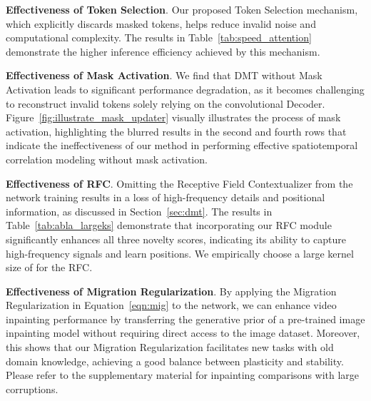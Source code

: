 \documentclass[10pt,twocolumn,letterpaper]{article}
\begin{document}
\noindent
\textbf{Effectiveness of Token Selection}. Our proposed Token Selection mechanism, which explicitly discards masked tokens, helps reduce invalid noise and computational complexity. The results in Table~\ref{tab:speed_attention} demonstrate the higher inference efficiency achieved by this mechanism.


\noindent
\textbf{Effectiveness of Mask Activation}. We find that DMT without Mask Activation leads to significant performance degradation, as it becomes challenging to reconstruct invalid tokens solely relying on the convolutional Decoder. Figure~\ref{fig:illustrate_mask_updater} visually illustrates the process of mask activation, highlighting the blurred results in the second and fourth rows that indicate the ineffectiveness of our method in performing effective spatiotemporal correlation modeling without mask activation.

\noindent
\textbf{Effectiveness of RFC}. Omitting the Receptive Field Contextualizer from the network training results in a loss of high-frequency details and positional information, as discussed in Section~\ref{sec:dmt}. The results in Table~\ref{tab:abla_largeks} demonstrate that incorporating our RFC module significantly enhances all three novelty scores, indicating its ability to capture high-frequency signals and learn positions. We empirically choose a large kernel size of  for the RFC.

\noindent
\textbf{Effectiveness of Migration Regularization}. By applying the Migration Regularization in Equation~\ref{eqn:mig} to the network, we can enhance video inpainting performance by transferring the generative prior of a pre-trained image inpainting model without requiring direct access to the image dataset. Moreover, this shows that our Migration Regularization facilitates new tasks with old domain knowledge, achieving a good balance between plasticity and stability. Please refer to the supplementary material for inpainting comparisons with large corruptions.
\end{document}
